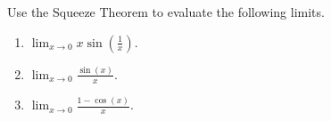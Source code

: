 \begin{example} 
\label{ex:SqueezeTheorem}
Use the Squeeze Theorem to evaluate the following limits.

\begin{enumerate}
\renewcommand{\labelenumi}{(\alph{enumi})}
\setlength{\itemsep}{.2cm}

    \item $\displaystyle \lim_{x \to 0} x \sin(\frac{1}{x})$.


        \item $\displaystyle \lim_{x \to 0} \frac{\sin(x)}{x}$.

    \item  $\displaystyle \lim_{x \to 0} \frac{1 - \cos(x)}{x}$.
\end{enumerate}
    
\end{example}

\solution 

